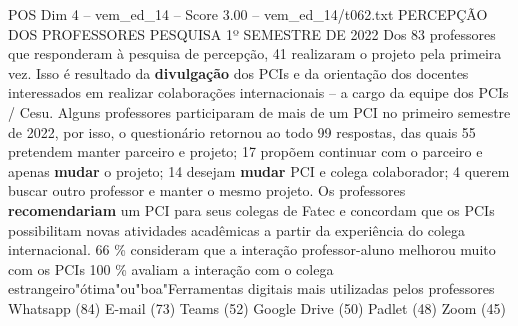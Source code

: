 \begin{textsample}{POS Dim 4 – vem\_ed\_14 – Score 3.00 – vem\_ed\_14/t062.txt}  \label{ex:f4_pos_149}
PERCEPÇÃO DOS PROFESSORES PESQUISA 1º SEMESTRE DE 2022 Dos 83 professores que responderam à pesquisa de percepção, 41 realizaram o projeto pela primeira vez.
Isso é resultado da \textbf{divulgação} dos PCIs e da orientação dos docentes interessados em realizar colaborações internacionais – a cargo da equipe dos PCIs / Cesu.
Alguns professores participaram de mais de um PCI no primeiro semestre de 2022, por isso, o questionário retornou ao todo 99 respostas, das quais 55 pretendem manter parceiro e projeto; 17 propõem continuar com o parceiro e apenas \textbf{mudar} o projeto; 14 desejam \textbf{mudar} PCI e colega colaborador; 4 querem buscar outro professor e manter o mesmo projeto.
Os professores \textbf{recomendariam} um PCI para seus colegas de Fatec e concordam que os PCIs possibilitam novas atividades acadêmicas a partir da experiência do colega internacional. 66 \% consideram que a interação professor-aluno melhorou muito com os PCIs 100 \% avaliam a interação com o colega estrangeiro"ótima"ou"boa"Ferramentas digitais mais utilizadas pelos professores Whatsapp (84) E-mail (73) Teams (52) Google Drive (50) Padlet (48) Zoom (45)

\end{textsample}

